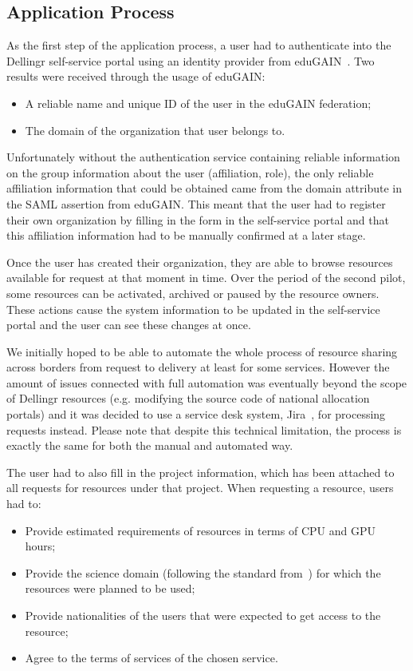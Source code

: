 \documentclass{article}
\newcommand{\dell}{Dellingr\xspace}
\begin{document}
\subsection{Application Process}
\label{ssec:application}

As the first step of the application process, a user had to authenticate into the \dell self-service portal using an identity provider from eduGAIN~\cite{edugain}. 
Two results were received through the usage of eduGAIN:
\begin{itemize}
    \item A reliable name and unique ID of the user in the eduGAIN federation;
    \item The domain of the organization that user belongs to.
\end{itemize}
Unfortunately without the authentication service containing reliable information on the group information about the user (affiliation, role), 
the only reliable affiliation information that could be obtained came from the domain attribute in the SAML assertion from eduGAIN. 
This meant that the user had to register their own organization by filling in the form in the self-service portal and that this affiliation information had to be manually confirmed at a later stage.

Once the user has created their organization, they are able to browse resources available for request at that moment in time. 
Over the period of the second pilot, some resources can be activated, archived or paused by the resource owners.
These actions cause the system information to be updated in the self-service portal and the user can see these changes at once.

We initially hoped to be able to automate the whole process of resource sharing across borders from request to delivery
at least for some services.
However the amount of issues connected with full automation was eventually beyond the scope of \dell resources
(e.g. modifying the source code of national allocation portals)
and it was decided to use a service desk system, Jira~\cite{jira}, for processing requests instead. 
Please note that despite this technical limitation, the process is exactly the same for both the manual and automated way.

The user had to also fill in the project information, which has been attached to all requests for resources under that project.
When requesting a resource, users had to:
\begin{itemize}
    \item Provide estimated requirements of resources in terms of CPU and GPU hours;
    \item Provide the science domain (following the standard from~\cite{science-domains}) for which the resources
          were planned to be used;
    \item Provide nationalities of the users that were expected to get access to the resource;
    \item Agree to the terms of services of the chosen service.
\end{itemize}
\end{document}
